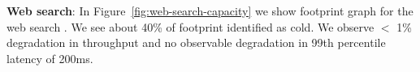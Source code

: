 \textbf{Web search}:
In Figure~\ref{fig:web-search-capacity} we show footprint graph for the web search
. We see about 40\% of footprint identified as cold. 
We observe $<$ 1\% degradation in throughput and no observable degradation in 99th
percentile latency of 200ms.

%
%
%

